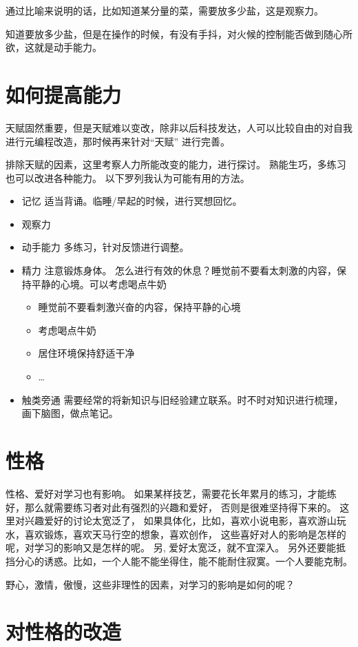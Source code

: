 \documentclass{book}
\begin{document}
通过比喻来说明的话，比如知道某分量的菜，需要放多少盐，这是观察力。

知道要放多少盐，但是在操作的时候，有没有手抖，对火候的控制能否做到随心所欲，这就是动手能力。

\section{如何提高能力}
天赋固然重要，但是天赋难以变改，除非以后科技发达，人可以比较自由的对自我进行元编程改造，那时候再来针对“天赋”
进行完善。

排除天赋的因素，这里考察人力所能改变的能力，进行探讨。
熟能生巧，多练习也可以改进各种能力。
以下罗列我认为可能有用的方法。
\begin{itemize}
    \item 记忆 \newline
        适当背诵。临睡/早起的时候，进行冥想回忆。
    \item 观察力
    \item 动手能力 \newline
        多练习，针对反馈进行调整。
    \item 精力 \newline
        注意锻炼身体。
        怎么进行有效的休息？睡觉前不要看太刺激的内容，保持平静的心境。可以考虑喝点牛奶
        \begin{itemize}
            \item 睡觉前不要看刺激兴奋的内容，保持平静的心境
            \item 考虑喝点牛奶
            \item 居住环境保持舒适干净
            \item \dots
        \end{itemize}
    \item 触类旁通 \newline
        需要经常的将新知识与旧经验建立联系。时不时对知识进行梳理，画下脑图，做点笔记。
\end{itemize}

\section{性格}
性格、爱好对学习也有影响。
如果某样技艺，需要花长年累月的练习，才能练好，那么就需要练习者对此有强烈的兴趣和爱好，
否则是很难坚持得下来的。
这里对兴趣爱好的讨论太宽泛了，
如果具体化，比如，喜欢小说电影，喜欢游山玩水，喜欢锻炼，喜欢天马行空的想象，喜欢创作，
这些喜好对人的影响是怎样的呢，对学习的影响又是怎样的呢。
另, 爱好太宽泛，就不宜深入。
另外还要能抵挡分心的诱惑。比如，一个人能不能坐得住，能不能耐住寂寞。一个人要能克制。

野心，激情，傲慢，这些非理性的因素，对学习的影响是如何的呢？

\section{对性格的改造}






\end{document}

